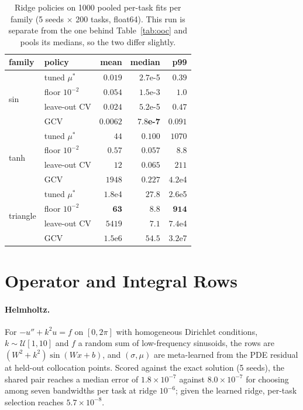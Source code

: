 \documentclass[fullpaper,final]{nldl}
\theoremstyle{plain}
\theoremstyle{definition}
\begin{document}
\begin{table}[tb]
\centering
\caption{Ridge policies on 1000 pooled per-task fits per family (5 seeds $\times$
200 tasks, float64). This run is separate from the one behind Table~\ref{tab:ooc}
and pools its medians, so the two differ slightly.}
\label{tab:ridgepolicy}
\footnotesize
\setlength{\tabcolsep}{3pt}
\begin{tabular}{llrrr}
\toprule
family & policy & mean & median & p99 \\
\midrule
\multirow{4}{*}{sin}
 & tuned $\mu^\ast$ & $0.019$ & $2.7$e-5 & $0.39$ \\
 & floor $10^{-2}$   & $0.054$ & $1.5$e-3 & $1.0$ \\
 & leave-out CV      & $0.024$ & $5.2$e-5 & $0.47$ \\
 & GCV               & $\mathbf{0.0062}$ & $\mathbf{7.8}$\textbf{e-7} & $\mathbf{0.091}$ \\
\midrule
\multirow{4}{*}{tanh}
 & tuned $\mu^\ast$ & $44$          & $0.100$ & $1070$ \\
 & floor $10^{-2}$   & $\mathbf{0.57}$ & $\mathbf{0.057}$ & $\mathbf{8.8}$ \\
 & leave-out CV      & $12$          & $0.065$ & $211$ \\
 & GCV               & $1948$        & $0.227$ & $4.2$e4 \\
\midrule
\multirow{4}{*}{triangle}
 & tuned $\mu^\ast$ & $1.8$e4       & $27.8$ & $2.6$e5 \\
 & floor $10^{-2}$   & $\mathbf{63}$ & $8.8$  & $\mathbf{914}$ \\
 & leave-out CV      & $5419$        & $\mathbf{7.1}$ & $7.4$e4 \\
 & GCV               & $1.5$e6       & $54.5$ & $3.2$e7 \\
\bottomrule
\end{tabular}
\end{table}

\section{Operator and Integral Rows}
\label{app:operator}

\paragraph{Helmholtz.}
\label{app:pde}
For $-u''+k^2u=f$ on $[0,2\pi]$ with homogeneous Dirichlet conditions,
$k\sim\mathcal{U}[1,10]$ and $f$ a random sum of low-frequency sinusoids, the rows
are $(W^2+k^2)\sin(Wx+b)$, and $(\sigma,\mu)$ are meta-learned from the PDE residual
at held-out collocation points. Scored against the exact solution (5 seeds), the
shared pair reaches a median error of $1.8\!\times\!10^{-7}$ against
$8.0\!\times\!10^{-7}$ for choosing among seven bandwidths per task at ridge
$10^{-6}$; given the learned ridge, per-task selection reaches
$5.7\!\times\!10^{-8}$.
\end{document}

